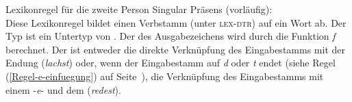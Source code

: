 \eas
\label{lr-verbal-inflection}
Lexikonregel für die zweite Person Singular Präsens (vorläufig):\\
\zs
Diese Lexikonregel bildet einen Verbstamm (unter \textsc{lex-dtr}) auf ein Wort ab. Der Typ
 ist ein Untertyp von . Der \phonw des Ausgabezeichens wird durch
die Funktion \textit{f} berechnet. Der \phonw ist entweder die direkte Verknüpfung des Eingabestamms
mit der Endung  (\emph{lachst}) oder, wenn der Eingabestamm auf \emph{d} oder \emph{t}
endet (siehe Regel (\ref{Regel-e-einfuegung}) auf Seite~\pageref{Regel-e-einfuegung}), die
Verknüpfung des Eingabestamms mit einem -\emph{e}- und dem  (\emph{redest}).  

